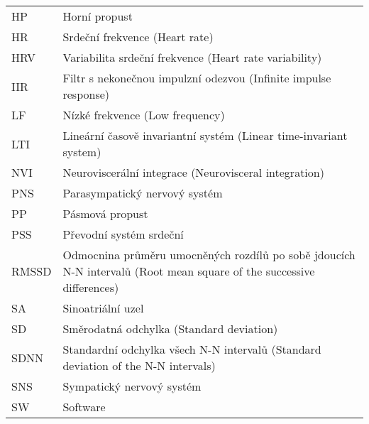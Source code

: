\begin{table}[h]
\begin{center}
\begin{tabular}{p{2.5cm}p{11.25cm}}
			HP      & Horní propust                                                                                                        \\
			HR      & Srdeční frekvence (Heart rate)                                                                                       \\
			HRV     & Variabilita srdeční frekvence (Heart rate variability)                                                               \\
			IIR     & Filtr s nekonečnou impulzní odezvou (Infinite impulse response)                                                      \\
			LF      & Nízké frekvence (Low frequency)                                                                                      \\
			LTI     & Lineární časově invariantní systém (Linear time-invariant system)                                                    \\
			NVI     & Neuroviscerální integrace (Neurovisceral integration)                                                                \\
			PNS     & Parasympatický nervový systém                                                                                        \\
			PP      & Pásmová propust                                                                                                      \\
			PSS     & Převodní systém srdeční                                                                                              \\
			RMSSD   & Odmocnina průměru umocněných rozdílů po sobě jdoucích N-N intervalů (Root mean square of the successive differences) \\
			SA      & Sinoatriální uzel                                                                                                    \\
			SD      & Směrodatná odchylka (Standard deviation)                                                                             \\
			SDNN    & Standardní odchylka všech N-N intervalů (Standard deviation of the N-N intervals)                                    \\
			SNS     & Sympatický nervový systém                                                                                            \\
			SW      & Software                                                                                                             \\

\end{tabular}
\end{center}
\end{table}
